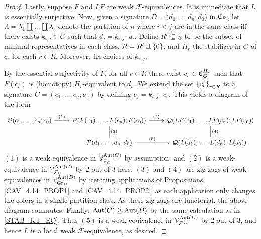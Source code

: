 \documentclass[a4paper,10pt
,draft
]{article}%
\renewcommand{\F}{\mathcal F}
\newcommand{\Q}{\mathcal Q}
\renewcommand{\1}{\eta}%
\begin{document}
\begin{proof}
      Lastly, suppose $F$ and $LF$ are weak $\F$-equivalences.
      It is immediate that $L$ is essentially surjective.
      Now, given a signature $D = (d_1,\ldots,d_n;d_0$) in $\mathfrak C_{\mathcal{P}}$,
      let $\Lambda = \lambda_1 \amalg \dots \amalg \lambda_r$ denote the partition of $\underline{n}$
      where $i < j$ are in the same class iff there exists $k_{i,j} \in G$ such that $d_j = k_{i,j} \cdot d_i$.
      Define $R' \subseteq \underline{n}$ to be the subset of minimal representatives in each class,
      $R = R' \amalg \left\{0\right\}$,
      and $H_r$ the stabilizer in $G$ of $c_r$ for each $r \in R$.
      Moreover, fix choices of $k_{r,j}$. 
      
      By the essential surjectivity of $F$, for all $r \in R$ there exist $c_r \in \mathfrak C_{\mathcal{O}}^{H_r}$ such that
      $F(c_r)$ is (homotopy) $H_r$-equivalent to $d_r$.
      We extend the set $\left\{c_r\right\}_{r\in R}$ to a signature $C = (c_1,\ldots, c_n;c_0)$
      by defining $c_j = k_{r,j} \cdot c_r$.
      This yields a diagram of the form
      \begin{equation}
            \label{TWOOFTHREE_EQ}
            \begin{tikzcd}
                  \O(c_1,\ldots, c_n;c_0) \arrow[r, "(1)"]
                  &
                  \P(F(c_1),\ldots, F(c_n); F(c_0)) \arrow[d,dash, "(3)"] \arrow[r, "(2)"]
                  &
                  \Q(LF(c_1),\ldots, LF(c_n);LF(c_0)) \arrow[d, dash, "(4)"]
                  \\
                  &
                  \P(d_1,\ldots, d_n;d_0) \arrow[r, "(5)"]
                  &
                  \Q(L(d_1),\ldots, L(d_n); L(d_0)).
            \end{tikzcd}
      \end{equation}
      $(1)$ is a weak equivalence in $\V^{\Aut(C)}_{\F_C}$ by assumption, and
      $(2)$ is a weak-equivalence in $\V^{\Aut(C)}_{\F_C}$ by 2-out-of-3 here.
      $(3)$ and $(4)$ are zig-zags of weak equivalences in $\mathcal V^{\operatorname{Aut}(D)}_{\mathrm{Gr}_D}$ by iterating applications of
      Propositions \ref{CAV_4.14_PROP1} and \ref{CAV_4.14_PROP2},
      as each application only changes the colors in a single partition class.
      As these zig-zags are functorial, the above diagram commutes.
      Finally, $\operatorname{Aut}(C) \geq \operatorname{Aut}(D)$ by the same calculation as in \eqref{STAB_KT_EQ}.
      Thus $(5)$ is a weak equivalence in $\V^{\Aut(D)}_{\F_D}$ by 2-out-of-3, and hence
      $L$ is a local weak $\F$-equivalence, as desired.
\end{proof}
\end{document}

